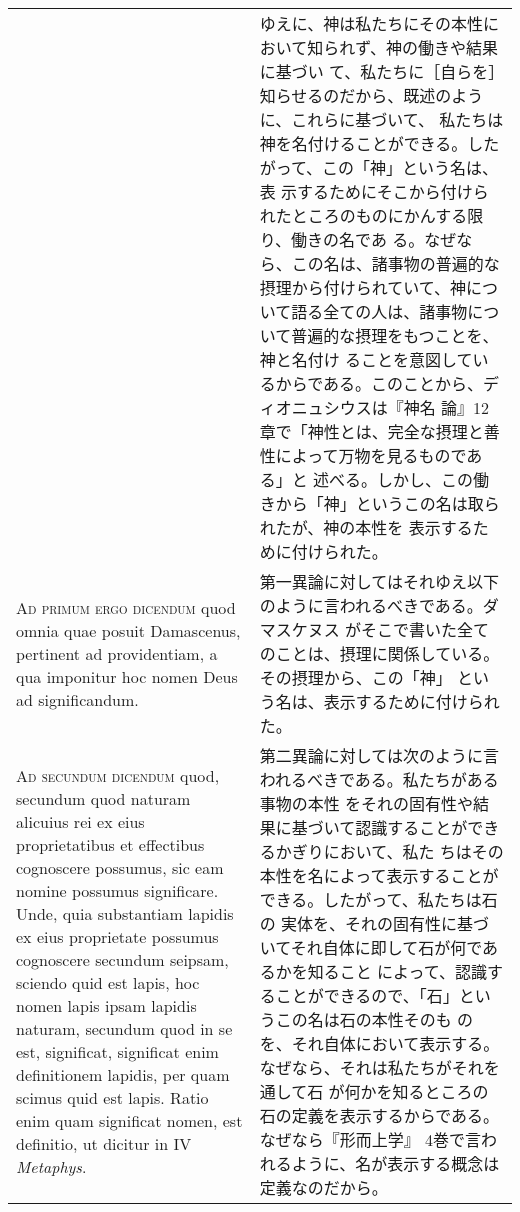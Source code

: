 \documentclass[paper=a4paper,fontsize=10pt,jafontsize=9pt,titlepage]{jlreq}
\begin{document}
\begin{longtable}{p{21em}p{21em}}
& ゆえに、神は私たちにその本性において知られず、神の働きや結果に基づい
て、私たちに［自らを］知らせるのだから、既述のように、これらに基づいて、
私たちは神を名付けることができる。したがって、この「神」という名は、表
示するためにそこから付けられたところのものにかんする限り、働きの名であ
る。なぜなら、この名は、諸事物の普遍的な摂理から付けられていて、神につ
いて語る全ての人は、諸事物について普遍的な摂理をもつことを、神と名付け
ることを意図しているからである。このことから、ディオニュシウスは『神名
論』12章で「神性とは、完全な摂理と善性によって万物を見るものである」と
述べる。しかし、この働きから「神」というこの名は取られたが、神の本性を
表示するために付けられた。

\\

{\scshape Ad primum ergo dicendum} quod omnia quae posuit Damascenus,
pertinent ad providentiam, a qua imponitur hoc nomen Deus ad
significandum.

&

第一異論に対してはそれゆえ以下のように言われるべきである。ダマスケヌス
がそこで書いた全てのことは、摂理に関係している。その摂理から、この「神」
という名は、表示するために付けられた。

\\

{\scshape Ad secundum dicendum} quod, secundum quod naturam alicuius
rei ex eius proprietatibus et effectibus cognoscere possumus, sic eam
nomine possumus significare. Unde, quia substantiam lapidis ex eius
proprietate possumus cognoscere secundum seipsam, sciendo quid est
lapis, hoc nomen lapis ipsam lapidis naturam, secundum quod in se est,
significat, significat enim definitionem lapidis, per quam scimus quid
est lapis.  Ratio enim quam significat nomen, est definitio, ut
dicitur in IV {\itshape Metaphys}.

&

第二異論に対しては次のように言われるべきである。私たちがある事物の本性
をそれの固有性や結果に基づいて認識することができるかぎりにおいて、私た
ちはその本性を名によって表示することができる。したがって、私たちは石の
実体を、それの固有性に基づいてそれ自体に即して石が何であるかを知ること
によって、認識することができるので、「石」というこの名は石の本性そのも
のを、それ自体において表示する。なぜなら、それは私たちがそれを通して石
が何かを知るところの石の定義を表示するからである。なぜなら『形而上学』
4巻で言われるように、名が表示する概念は定義なのだから。

\\


\end{longtable}
\end{document}
